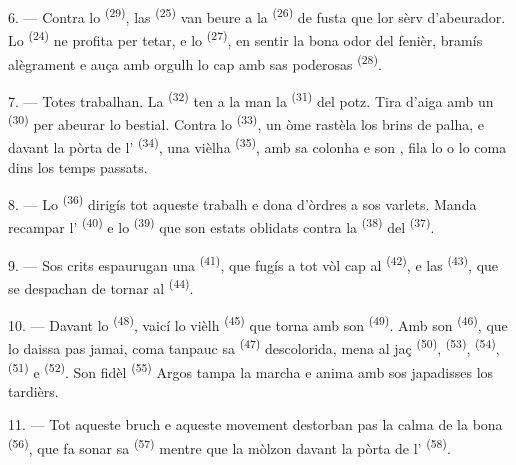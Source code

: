 6. --- Contra lo  \textsuperscript{(29)}, las 
\textsuperscript{(25)} van beure a la  \textsuperscript{(26)} de fusta
que lor sèrv d'abeurador. Lo  \textsuperscript{(24)} ne profita per
tetar, e lo  \textsuperscript{(27)}, en sentir la bona odor del
fenièr, bramís alègrament e auça amb orgulh lo cap amb sas poderosas
 \textsuperscript{(28)}.

7. --- Totes trabalhan. La  \textsuperscript{(32)} ten a la man
la  \textsuperscript{(31)} del potz. Tira d'aiga amb un
 \textsuperscript{(30)} per abeurar lo bestial. Contra lo
 \textsuperscript{(33)}, un òme rastèla los brins de palha, e
davant la pòrta de l' \textsuperscript{(34)}, una vièlha
 \textsuperscript{(35)}, amb sa colonha e son , fila lo
 o lo  coma dins los temps passats.

\VUsaut{3.0mm}
\VUsaut{3.0mm}

8. --- Lo  \textsuperscript{(36)} dirigís tot aqueste trabalh e
dona d'òrdres a sos varlets. Manda recampar l'
\textsuperscript{(40)} e lo  \textsuperscript{(39)} que son estats
oblidats contra la  \textsuperscript{(38)} del 
\textsuperscript{(37)}.

9. --- Sos crits espaurugan una  \textsuperscript{(41)}, que fugís
a tot vòl cap al  \textsuperscript{(42)}, e las 
\textsuperscript{(43)}, que se despachan de tornar al 
\textsuperscript{(44)}.

10. --- Davant lo  \textsuperscript{(48)}, vaicí lo vièlh
 \textsuperscript{(45)} que torna amb son 
\textsuperscript{(49)}. Amb son  \textsuperscript{(46)}, que lo
daissa pas jamai, coma tanpauc sa  \textsuperscript{(47)}
descolorida, mena al jaç  \textsuperscript{(50)},
 \textsuperscript{(53)}, 
\textsuperscript{(54)},  \textsuperscript{(51)} e
 \textsuperscript{(52)}. Son fidèl 
\textsuperscript{(55)} Argos tampa la marcha e anima amb sos japadisses los
tardièrs.

11. --- Tot aqueste bruch e aqueste movement destorban pas la calma de la bona
 \textsuperscript{(56)}, que fa sonar sa 
\textsuperscript{(57)} mentre que la mòlzon davant la pòrta de l'
\textsuperscript{(58)}.

